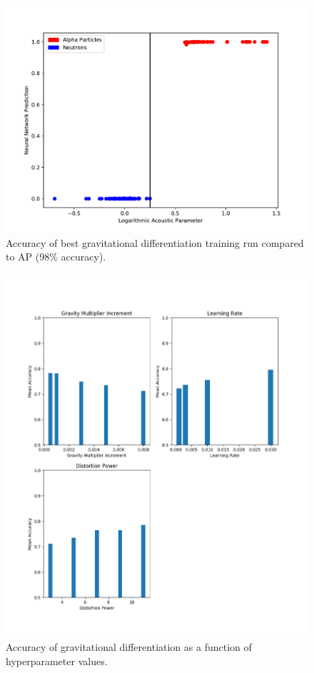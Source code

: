 \documentclass[10pt]{article}
\begin{document}
\begin{figure}[H]
    \centering
    \includegraphics[width=\textwidth]{grav_grid_search}
    \caption{\label{grav_grid_search} Accuracy of best gravitational differentiation training run compared to AP (98\% accuracy).}
\end{figure}

\begin{figure}[H]
    \centering
    \includegraphics[width=\textwidth]{grav_acc_by_hyper}
    \caption{\label{grav_acc_by_hyper} Accuracy of gravitational differentiation as a function of hyperparameter values.}
\end{figure}
\end{document}
